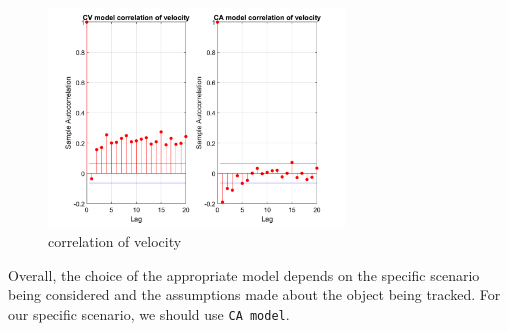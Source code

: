 \begin{figure}[H]
 \centering
 \includegraphics[width=0.7\textwidth]{images/correlationofvelocity.png}
 \caption{correlation of velocity}
 \label{2d2}
\end{figure}

Overall, the choice of the appropriate model depends on the specific scenario being considered and the assumptions made about the object being tracked. For our specific scenario, we should use \texttt{CA model}.